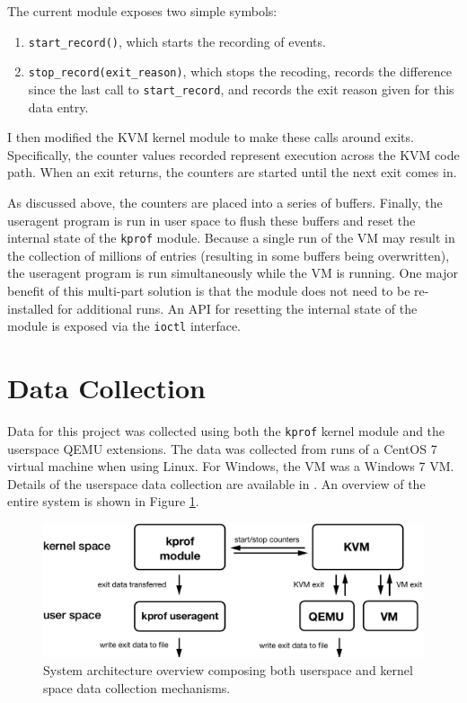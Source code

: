 \documentclass[notitlepage]{article}
\begin{document}
The current module exposes two simple symbols:
\begin{enumerate}
    \item{\texttt{start\_record()}, which starts the recording of events.}
    \item{\texttt{stop\_record(exit\_reason)}, which stops the recoding, records
        the difference since the last call to \texttt{start\_record}, and
    records the exit reason given for this data entry.}
\end{enumerate}

I then modified the KVM kernel module to make these calls around exits.
Specifically, the counter values recorded represent execution across the KVM
code path. When an exit returns, the counters are started until the next exit
comes in.

As discussed above, the counters are placed into a series of buffers. Finally,
the useragent program is run in user space to flush these buffers and reset the
internal state of the \texttt{kprof} module. Because a single run of the VM may
result in the collection of millions of entries (resulting in some buffers being
overwritten), the useragent program is run simultaneously while the VM is
running. One major benefit of this multi-part solution is that the module does
not need to be re-installed for additional runs. An API for resetting the
internal state of the module is exposed via the \texttt{ioctl} interface.


\section{Data Collection}
\label{sec:data}
Data for this project was collected using both the \texttt{kprof} kernel module
and the userspace QEMU extensions. The data was collected from runs of a CentOS
7 virtual machine when using Linux. For Windows, the VM was a Windows 7 VM.
Details of the userspace data collection are available in \cite{f14}. An
overview of the entire system is shown in Figure \ref{fig:diagram}.

\begin{figure}[htp]
    \centering
    \includegraphics[width=4.5in]{diagram.pdf}
    \caption{System architecture overview composing both userspace and kernel
    space data collection mechanisms.}
    \label{fig:diagram}
\end{figure}
\end{document}
